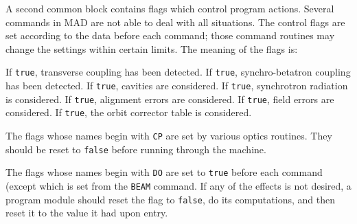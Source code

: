 A second common block contains flags which control program actions.
Several commands in MAD are not able to deal with all situations.
The control flags are set according to the data before each command;
those command routines may change the settings within certain limits.
The meaning of the flags is:
\begin{mylist}
If {\tt true}, transverse coupling has been detected.
If {\tt true}, synchro-betatron coupling has been detected.
If {\tt true}, cavities are considered.
If {\tt true}, synchrotron radiation is considered.
If {\tt true}, alignment errors are considered.
If {\tt true}, field errors are considered.
If {\tt true}, the orbit corrector table is considered.
\end{mylist}
The flags whose names begin with {\tt CP} are set by various optics
routines. They should be reset to {\tt false} before running through
the machine.

The flags whose names begin with {\tt DO} are set to {\tt true} before
each command (except  which is set from the {\tt BEAM}
command.
If any of the effects is not desired,
a program module should reset the flag to {\tt false},
do its computations, and then reset it to the value it had upon entry.
 
